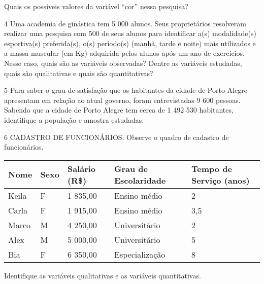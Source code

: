 {\begin{escolha}
\item
  Quais os possíveis valores da variável ``cor'' nessa pesquisa?

\end{escolha}


\num{4} Uma academia de ginástica tem 5 000 alunos. Seus proprietários
resolveram realizar uma pesquisa com 500 de seus alunos para identificar
a(s) modalidade(s) esportiva(s) preferida(s), o(s) período(s) (manhã,
tarde e noite) mais utilizados e a massa muscular (em Kg) adquirida
pelos alunos após um ano de exercícios. Nesse caso, quais são as
variáveis observadas? Dentre as variáveis estudadas, quais são
qualitativas e quais são quantitativas?



\num{5} Para saber o grau de satisfação que os habitantes da cidade de Porto
Alegre apresentam em relação ao atual governo, foram entrevistadas 9 600
pessoas. Sabendo que a cidade de Porto Alegre tem cerca de 1 492 530
habitantes, identifique a população e amostra estudadas.



\num{6} CADASTRO DE FUNCIONÁRIOS. Observe o quadro de cadastro de
funcionários.

\begin{longtable}[]{@{}lllll@{}}
\toprule
\textbf{Nome} & \textbf{Sexo} & \textbf{Salário (R\$)} & \textbf{Grau de
Escolaridade} & \textbf{Tempo de Serviço (anos)}\tabularnewline
\midrule
\endhead
Keila & F & 1 835,00 & Ensino médio & 2\tabularnewline
Carla & F & 1 915,00 & Ensino médio & 3,5\tabularnewline
Marco & M & 4 250,00 & Universitário & 2\tabularnewline
Alex & M & 5 000,00 & Universitário & 5\tabularnewline
Bia & F & 6 350,00 & Especialização & 8\tabularnewline
\bottomrule
\end{longtable}

Identifique as variáveis qualitativas e as variáveis quantitativas.

}
